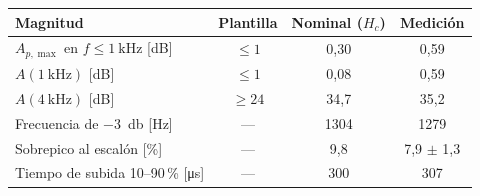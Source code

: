 \begin{tabular}{@{}lccc@{}}
\toprule
Magnitud & Plantilla & Nominal ($H_c$) & Medición \\
\midrule
$A_{p,\max}$ en $f \le \qty{1}{\kilo\hertz}$ [dB] & $\le 1$ & 0{,}30 & 0{,}59 \\
$A(\qty{1}{\kilo\hertz})$ [dB] & $\le 1$ & 0{,}08 & 0{,}59 \\
$A(\qty{4}{\kilo\hertz})$ [dB] & $\ge 24$ & 34{,}7 & 35{,}2 \\
Frecuencia de \qty{-3}{\decibel} [Hz] & --- & 1304 & 1279 \\
Sobrepico al escalón [\%] & --- & 9{,}8 & 7{,}9 $\pm$ 1{,}3 \\
Tiempo de subida 10--90\,\% [\si{\micro\second}] & --- & 300 & 307 \\
\bottomrule
\end{tabular}